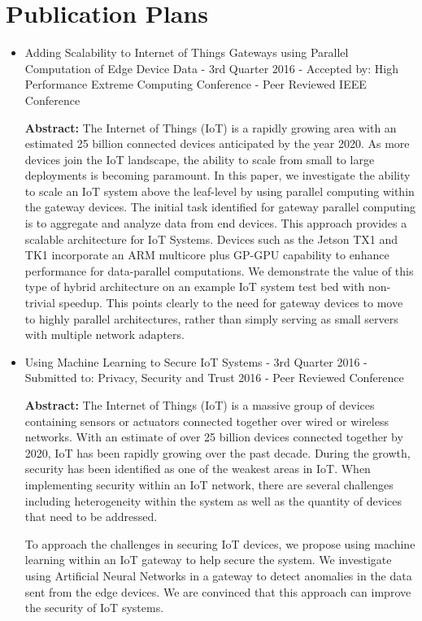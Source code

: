 \documentclass[../main.tex]{subfiles}
\begin{document}
\chapter{Publication Plans}

\begin{itemize}
    \item Adding Scalability to Internet of Things Gateways using Parallel Computation of Edge Device Data - 3rd Quarter 2016 - Accepted by: High Performance Extreme Computing Conference - Peer Reviewed IEEE Conference

    
\textbf{Abstract:} The Internet of Things (IoT) is a rapidly growing area with an estimated 25 billion connected devices anticipated   by the year 2020. As more devices join the IoT landscape, the    ability to scale from small to large deployments   is becoming paramount. In this paper, we investigate the ability to scale an IoT system above the leaf-level by using parallel computing within the gateway devices.  The initial task identified  for gateway parallel computing is to aggregate and analyze data from end devices.
This approach provides a scalable architecture for IoT Systems.  Devices such as the Jetson TX1 and TK1 incorporate an ARM multicore plus GP-GPU capability to enhance performance for data-parallel computations.  We demonstrate the value of this type of hybrid architecture on an example IoT system test bed with non-trivial speedup.  This points clearly to the need for gateway devices to move to highly parallel architectures, rather than simply serving as small servers with multiple network adapters.    

    \item Using Machine Learning to Secure IoT Systems - 3rd Quarter 2016 - Submitted to: Privacy, Security and Trust 2016 - Peer Reviewed Conference
    
\textbf{Abstract:} The Internet of Things (IoT) is a massive group of devices containing sensors or actuators connected together over wired or wireless networks. With an estimate of over 25 billion devices connected together by 2020, IoT has been rapidly growing over the past decade. During the growth, security has been identified as one of the weakest areas in IoT. When implementing security within an IoT network, there are several challenges including heterogeneity within the system as well as the quantity of devices that need to be addressed. 


To approach the challenges in securing IoT devices, we propose using machine learning within an IoT gateway to help secure the system. We investigate using Artificial Neural Networks in a gateway to detect anomalies in the data sent from the edge devices. We are convinced that this approach can improve the security of IoT systems.



\end{itemize}
\end{document}
